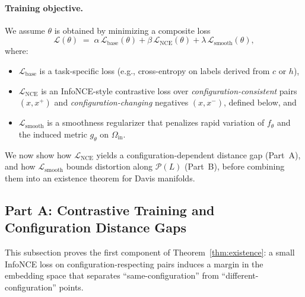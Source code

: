 \documentclass[11pt]{article}
\theoremstyle{remark}
\theoremstyle{plain}
\begin{document}
\paragraph{Training objective.}
We assume $\theta$ is obtained by minimizing a composite loss
\begin{equation}
\label{eq:existence-objective}
\mathcal{L}(\theta)
\;=\;
\alpha \,\mathcal{L}_{\mathrm{base}}(\theta)
+ \beta \,\mathcal{L}_{\mathrm{NCE}}(\theta)
+ \lambda \,\mathcal{L}_{\mathrm{smooth}}(\theta),
\end{equation}
where:
\begin{itemize}
  \item $\mathcal{L}_{\mathrm{base}}$ is a task-specific loss (e.g., cross-entropy on labels
    derived from $c$ or $h$),
  \item $\mathcal{L}_{\mathrm{NCE}}$ is an InfoNCE-style contrastive loss over
    \emph{configuration-consistent} pairs $(x,x^+)$ and \emph{configuration-changing} negatives
    $(x,x^-)$, defined below, and
  \item $\mathcal{L}_{\mathrm{smooth}}$ is a smoothness regularizer that penalizes rapid variation of
    $f_\theta$ and the induced metric $g_\theta$ on $\Omega_{\mathrm{in}}$.
\end{itemize}

We now show how $\mathcal{L}_{\mathrm{NCE}}$ yields a configuration-dependent distance gap (Part~A),
and how $\mathcal{L}_{\mathrm{smooth}}$ bounds distortion along $\mathcal{P}(L)$ (Part~B), before
combining them into an existence theorem for Davis manifolds.

\subsection{Part A: Contrastive Training and Configuration Distance Gaps}
\label{subsec:existence-contrastive}

This subsection proves the first component of Theorem~\ref{thm:existence}: a small InfoNCE loss
on configuration-respecting pairs induces a margin in the embedding space that separates
``same-configuration'' from ``different-configuration'' points.
\end{document}

